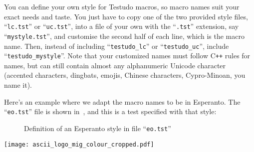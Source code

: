 \documentclass[twoside, a4paper, article]{memoir}
\newcommand\typesetexample[1]{%
  \typesetexamplesource{#1}
}
\providecommand\typesetexamplesource[1]{%
}
\newcommand*\Cpp{C\texttt{++}}
\begin{document}
You can define your own style for Testudo macros, so macro names suit your
exact needs and taste.  You just have to copy one of the two provided style
files, ``\texttt{lc.tst}'' or ``\texttt{uc.tst}'', into a file of your own with
the ``\texttt{.tst}'' extension, say ``\texttt{mystyle.tst}'', and customise
the second half of each line, which is the macro name.  Then, instead of
including ``\texttt{testudo\_lc}'' or ``\texttt{testudo\_uc}'', include
``\texttt{testudo\_mystyle}''.  Note that your customized names must follow
\Cpp{} rules for names, but can still contain almost any alphanumeric Unicode
character (accented characters, dingbats, emojis, Chinese characters,
Cypro-Minoan, you name it).

Here's an example where we adapt the macro names to be in Esperanto.  The
``\texttt{eo.tst}'' file is shown in~, and this is a
test specified with that style:

\typesetexample{esperanto}

\begin{figure}
  \centering
  \caption{Definition of an Esperanto style in file ``\texttt{eo.tst}''}
  \label{fig:esperanto-style}
\end{figure}

\backmatter

\cleartoevenpage

\thispagestyle{empty}

\vspace*{\fill}

\begin{center}
\texttt{[image: ascii\_logo\_mig\_colour\_cropped.pdf]}
\end{center}
\end{document}
